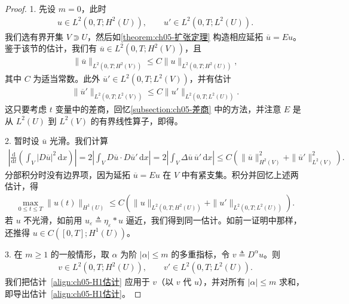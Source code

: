 \documentclass[../../main.tex]{subfiles}
\begin{document}
\begin{proof}

1. 先设 $m=0$，此时
\begin{align*}
u\in L^{2}(0,T;H^{2}(U)),\qquad u'\in L^{2}(0,T;L^{2}(U)).
\end{align*}
我们选有界开集 $V\Supset U$，然后如\cref{theorem:ch05-扩张定理} 构造相应延拓 $\overline{u}=Eu$。鉴于该节的估计，我们有 $\overline{u}\in L^{2}(0,T;H^{2}(V))$，且
\begin{align}
\|\overline{u}\|_{L^{2}(0,T;H^{2}(V))}\leqslant C\|u\|_{L^{2}(0,T;H^{2}(U))},
\end{align}
其中 $C$ 为适当常数。此外 $\overline{u}'\in L^{2}(0,T;L^{2}(V))$，并有估计
\begin{align}
\|\overline{u}'\|_{L^{2}(0,T;L^{2}(V))}\leqslant C\|u'\|_{L^{2}(0,T;L^{2}(U))}.
\end{align}
这只要考虑 $t$ 变量中的差商，回忆\cref{subsection:ch05-差商} 中的方法，并注意 $E$ 是从 $L^{2}(U)$ 到 $L^{2}(V)$ 的有界线性算子，即得。

2. 暂时设 $\overline{u}$ 光滑。我们计算
\begin{align*}
\left|\frac{\mathrm{d}}{\mathrm{d}t}\left(\int_{V}|D\overline{u}|^{2}\,\mathrm{d}x\right)\right|
=2\left|\int_{V}D\overline{u}\cdot D\overline{u}'\,\mathrm{d}x\right|
=2\left|\int_{V}\Delta\overline{u}\,\overline{u}'\,\mathrm{d}x\right|
\leqslant C\left(\|\overline{u}\|_{H^{2}(V)}^{2}+\|\overline{u}'\|_{L^{2}(V)}^{2}\right).
\end{align*}
分部积分时没有边界项，因为延拓 $\overline{u}=Eu$ 在 $V$ 中有紧支集。积分并回忆上述两估计，得
\begin{align}
\max_{0\leqslant t\leqslant T}\|u(t)\|_{H^{1}(U)}
\leqslant C\left(\|u\|_{L^{2}(0,T;H^{2}(U))}+\|u'\|_{L^{2}(0,T;L^{2}(U))}\right).
\end{align}
若 $u$ 不光滑，如前用 $u_{\varepsilon}\triangleq\eta_{\varepsilon}*u$ 逼近，我们得到同一估计。如前一证明中那样，还推得 $u\in C([0,T];H^{1}(U))$。

3. 在 $m\geqslant 1$ 的一般情形，取 $\alpha$ 为阶 $|\alpha|\leqslant m$ 的多重指标，令 $v\triangleq D^{\alpha}u$。则
\begin{align*}
v\in L^{2}(0,T;H^{2}(U)),\qquad v'\in L^{2}(0,T;L^{2}(U)).
\end{align*}
我们把估计~\eqref{align:ch05-H1估计} 应用于 $v$（以 $v$ 代 $u$），并对所有 $|\alpha|\leqslant m$ 求和，即导出估计~\eqref{align:ch05-H1估计}。
\end{proof}
\end{document}
